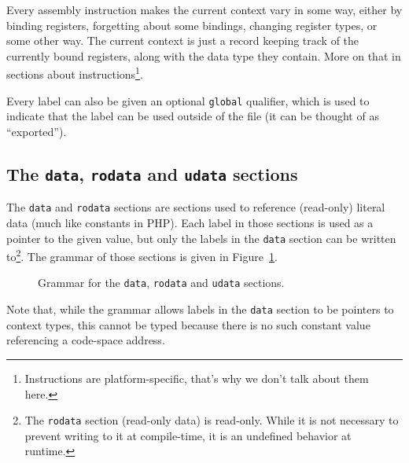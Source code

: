 Every assembly instruction makes the current context vary in some way, either by binding registers, forgetting about some bindings, changing register types, or some other way. The current context is just a record keeping track of the currently bound registers, along with the data type they contain.
More on that in sections about instructions\footnote{Instructions are platform-specific, that's why we don't talk about them here.}.

Every label can also be given an optional \texttt{global} qualifier, which is used to indicate that the label can be used outside of the file (it can be thought of as ``exported'').

\subsection{The \texttt{data}, \texttt{rodata} and \texttt{udata} sections}\label{subsec:nstar-common-sections-data}

The \texttt{data} and \texttt{rodata} sections are sections used to reference (read-only) literal data (much like constants in PHP).
Each label in those sections is used as a pointer to the given value, but only the labels in the \texttt{data} section can be written to\footnote{The \texttt{rodata} section (read-only data) is read-only. While it is not necessary to prevent writing to it at compile-time, it is an undefined behavior at runtime.}.
The grammar of those sections is given in Figure~\ref{fig:nstar-common-sections-data-grammar}.

\begin{figure}[htb]
  \centering


  \caption{Grammar for the \texttt{data}, \texttt{rodata} and \texttt{udata} sections.}
  \label{fig:nstar-common-sections-data-grammar}
\end{figure}

\noindent Note that, while the grammar allows labels in the \texttt{data} section to be pointers to context types, this cannot be typed because there is no such constant value referencing a code-space address.

